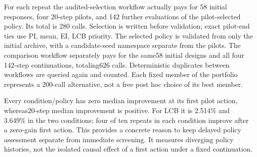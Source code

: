 \documentclass[]{interact}
\begin{document}
For each repeat the audited-selection workflow actually pays for 58 initial responses, four 20-step pilots, and 142 further evaluations of the pilot-selected policy. Its total is 280 calls. Selection is written before validation; exact pilot-end ties use PI, mean, EI, LCB priority. The selected policy is validated from only the initial archive, with a candidate-seed namespace separate from the pilots. The comparison workflow separately pays for the same58 initial designs and all four 142-step continuations, totaling626 calls. Deterministic duplicates between workflows are queried again and counted. Each fixed member of the portfolio represents a 200-call alternative, not a free post hoc choice of its best member.

Every condition/policy has zero median improvement at its first pilot action, whereas20-step median improvement is positive. For LCB it is 2.514\% and 3.649\% in the two conditions; four of ten repeats in each condition improve after a zero-gain first action. This provides a concrete reason to keep delayed policy assessment separate from immediate screening. It measures diverging policy histories, not the isolated causal effect of a first action under a fixed continuation.

\FloatBarrier\begingroup\fontsize{8.5}{10.5}\selectfont\setlength\tabcolsep{3pt}
\end{document}
